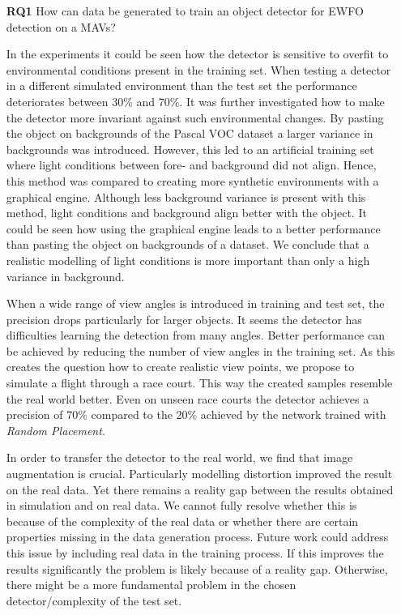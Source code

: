 \begin{enumerate}
	\item[\textbf{RQ1}]How can data be generated to train an object detector for \ac{EWFO} detection on a \acp{MAV}?
	
	In the experiments it could be seen how the detector is sensitive to overfit to environmental conditions present in the training set. When testing a detector in a different simulated environment than the test set the performance deteriorates between 30\% and 70\%. It was further investigated how to make the detector more invariant against such environmental changes. By pasting the object on backgrounds of the Pascal VOC dataset a larger variance in backgrounds was introduced. However, this led to an artificial training set where light conditions between fore- and background did not align. Hence, this method was compared to creating more synthetic environments with a graphical engine. Although less background variance is present with this method, light conditions and background align better with the object. It could be seen how using the graphical engine leads to a better performance than pasting the object on backgrounds of a dataset. We conclude that a realistic modelling of light conditions is more important than only a high variance in background.
	
	When a wide range of view angles is introduced in training and test set, the precision drops particularly for larger objects. It seems the detector has difficulties learning the detection from many angles. Better performance can be achieved by reducing the number of view angles in the training set. As this creates the question how to create realistic view points, we propose to simulate a flight through a race court. This way the created samples resemble the real world better. Even on unseen race courts the detector achieves a precision of 70\% compared to the 20\% achieved by the network trained with \textit{Random Placement}. 
	
	In order to transfer the detector to the real world, we find that image augmentation is crucial. Particularly modelling distortion improved the result on the real data. Yet there remains a reality gap between the results obtained in simulation and on real data. We cannot fully resolve whether this is because of the complexity of the real data or whether there are certain properties missing in the data generation process. Future work could address this issue by including real data in the training process. If this improves the results significantly the problem is likely because of a reality gap. Otherwise, there might be a more fundamental problem in the chosen detector/complexity of the test set.
	


\end{enumerate}
